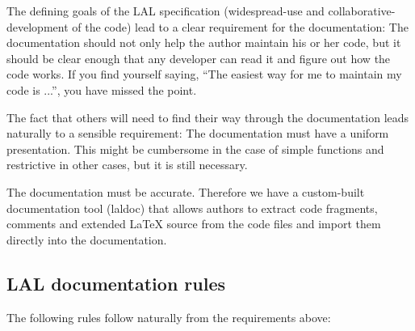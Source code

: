 \documentclass[]{ligodcc}
\begin{document}
The defining goals of the LAL specification (widespread-use and
collaborative-development of the code) lead to a clear requirement for
the documentation: The documentation should not  only help the author
maintain his or her code, but it should be clear enough that any
developer can read it and figure out how the code works. If you find
yourself saying, ``The easiest way for me to maintain my code is
...'',  you have missed the point.

The fact that others will need to find their way through the
documentation  leads naturally to a sensible requirement: The
documentation must have a uniform presentation. This might be
cumbersome in the case of simple functions  and restrictive in other
cases, but it is still necessary.

The documentation must be accurate. Therefore we have a custom-built
documentation tool (laldoc) that  allows authors to extract code
fragments, comments and extended LaTeX source from the code files and
import them  directly into the documentation.


\subsection{LAL documentation rules}

The following rules follow naturally from the requirements above:
\end{document}
